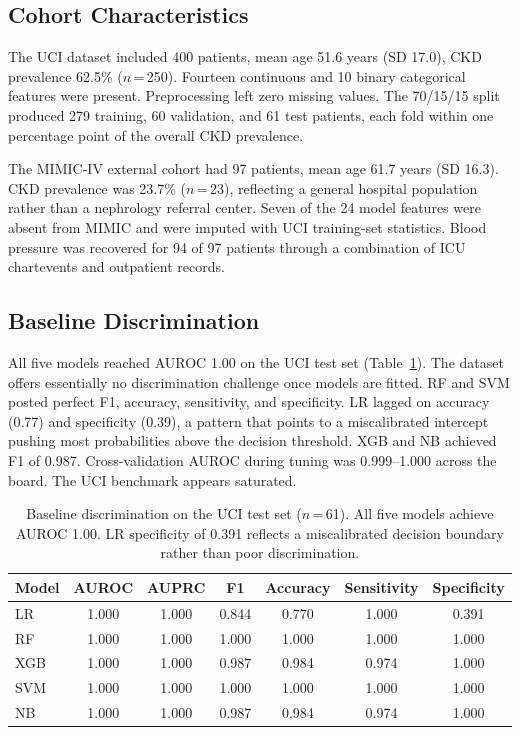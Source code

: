 \subsection{Cohort Characteristics}

The UCI dataset included 400 patients, mean age 51.6 years (SD 17.0), CKD prevalence 62.5\% ($n$\,=\,250). Fourteen continuous and 10 binary categorical features were present. Preprocessing left zero missing values. The 70/15/15 split produced 279 training, 60 validation, and 61 test patients, each fold within one percentage point of the overall CKD prevalence.

The MIMIC-IV external cohort had 97 patients, mean age 61.7 years (SD 16.3). CKD prevalence was 23.7\% ($n$\,=\,23), reflecting a general hospital population rather than a nephrology referral center. Seven of the 24 model features were absent from MIMIC and were imputed with UCI training-set statistics. Blood pressure was recovered for 94 of 97 patients through a combination of ICU chartevents and outpatient records.

\subsection{Baseline Discrimination}

All five models reached AUROC 1.00 on the UCI test set (Table~\ref{tab:t1}). The dataset offers essentially no discrimination challenge once models are fitted. RF and SVM posted perfect F1, accuracy, sensitivity, and specificity. LR lagged on accuracy (0.77) and specificity (0.39), a pattern that points to a miscalibrated intercept pushing most probabilities above the decision threshold. XGB and NB achieved F1 of 0.987. Cross-validation AUROC during tuning was 0.999--1.000 across the board. The UCI benchmark appears saturated.

\begin{table}[ht]
\centering
\caption{Baseline discrimination on the UCI test set ($n$\,=\,61). All five models achieve AUROC 1.00. LR specificity of 0.391 reflects a miscalibrated decision boundary rather than poor discrimination.}
\label{tab:t1}
\begin{tabular}{lcccccc}
\toprule
Model & AUROC & AUPRC & F1 & Accuracy & Sensitivity & Specificity \\
\midrule
LR  & 1.000 & 1.000 & 0.844 & 0.770 & 1.000 & 0.391 \\
RF  & 1.000 & 1.000 & 1.000 & 1.000 & 1.000 & 1.000 \\
XGB & 1.000 & 1.000 & 0.987 & 0.984 & 0.974 & 1.000 \\
SVM & 1.000 & 1.000 & 1.000 & 1.000 & 1.000 & 1.000 \\
NB  & 1.000 & 1.000 & 0.987 & 0.984 & 0.974 & 1.000 \\
\bottomrule
\end{tabular}
\end{table}

